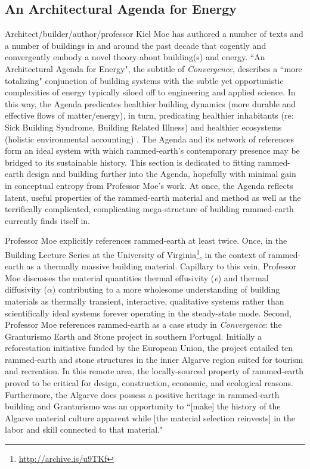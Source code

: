 \subsection{An Architectural Agenda for Energy}

Architect/builder/author/professor Kiel Moe has authored a number of texts and a number of buildings in and around the past decade that cogently and convergently embody a novel theory about building(s) and energy. ``An Architectural Agenda for Energy", the subtitle of \textit{Convergence}, describes a ``more totalizing" conjunction of building systems with the subtle yet opportunistic complexities of energy typically siloed off to engineering and applied science. In this way, the Agenda predicates healthier building dynamics (more durable and effective flows of matter/energy), in turn, predicating healthier inhabitants (re: Sick Building Syndrome, Building Related Illness) and healthier ecosystems (holistic environmental accounting) \cite{MOECONVERGENCE}. The Agenda and its network of references form an ideal system with which rammed-earth's contemporary presence may be bridged to its sustainable history. This section is dedicated to fitting rammed-earth design and building further into the Agenda, hopefully with minimal gain in conceptual entropy from Professor Moe's work. At once, the Agenda reflects latent, useful properties of the rammed-earth material and method as well as the terrifically complicated, complicating mega-structure of building rammed-earth currently finds itself in.

Professor Moe explicitly references rammed-earth at least twice. Once, in the Building Lecture Series at the University of Virginia\footnote{\url{http://archive.is/u9TKf}}, in the context of rammed-earth as a thermally massive building material. Capillary to this vein, Professor Moe discusses the material quantities thermal effusivity (\textit{e}) and thermal diffusivity ($\alpha$) contributing to a more wholesome understanding of building materials as thermally transient, interactive, qualitative systems rather than scientifically ideal systems forever operating in the steady-state mode. Second, Professor Moe references rammed-earth as a case study in \textit{Convergence}: the Granturismo Earth and Stone project in southern Portugal. Initially a reforestation initiative funded by the European Union, the project entailed ten rammed-earth and stone structures in the inner Algarve region suited for tourism and recreation. In this remote area, the locally-sourced property of rammed-earth proved to be critical for design, construction, economic, and ecological reasons. Furthermore, the Algarve does possess a positive heritage in rammed-earth building and Granturismo was an opportunity to ``[make] the history of the Algarve material culture apparent while [the material selection reinvests] in the labor and skill connected to that material." \cite{MOECONVERGENCE}

